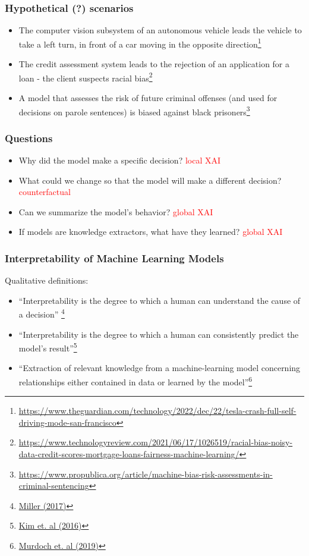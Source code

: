 \begin{frame}
  \frametitle{Hypothetical (?) scenarios}

  \begin{itemize}
  \item<1-> The computer vision subsystem of an autonomous vehicle leads the
    vehicle to take a left turn, in front of a car moving in the opposite direction\footnote{\url{https://www.theguardian.com/technology/2022/dec/22/tesla-crash-full-self-driving-mode-san-francisco}}
  \item<2-> The credit assessment system leads to the rejection of an
    application for a loan - the client suspects racial bias\footnote{\url{https://www.technologyreview.com/2021/06/17/1026519/racial-bias-noisy-data-credit-scores-mortgage-loans-fairness-machine-learning/}}
  \item<3-> A model that assesses the risk of future criminal offenses (and
    used for decisions on parole sentences) is biased against black
    prisoners\footnote{\url{https://www.propublica.org/article/machine-bias-risk-assessments-in-criminal-sentencing}}
  \end{itemize}

\end{frame}

\begin{frame}
  \frametitle{Questions}
  \begin{itemize}
  \item Why did the model make a specific decision? \textcolor{red}{local XAI}
  \item What could we change so that the model will make a different decision? \textcolor{red}{counterfactual}
  \item Can we summarize the model's behavior? \textcolor{red}{global XAI}
  \item If models are knowledge extractors, what have they learned? \textcolor{red}{global XAI}
  \end{itemize}
\end{frame}

\begin{frame}
  \frametitle{Interpretability of Machine Learning Models}
  Qualitative definitions:
  \begin{itemize}
  \item<1-> ``Interpretability is the degree to which a human can understand the
    cause of a decision'' \footnote{\href{https://arxiv.org/abs/1706.07269}{Miller (2017)}}
  \item<2-> ``Interpretability is the degree to which a human can consistently
    predict the model’s result''\footnote{\href{https://papers.nips.cc/paper/2016/hash/5680522b8e2bb01943234bce7bf84534-Abstract.html}{Kim et. al (2016)}}
  \item<3-> ``Extraction of relevant knowledge from a machine-learning model
    concerning relationships either contained in data or learned by the
    model''\footnote{\href{https://www.pnas.org/doi/10.1073/pnas.1900654116}{Murdoch et. al (2019)}}
  \end{itemize}
\end{frame}


